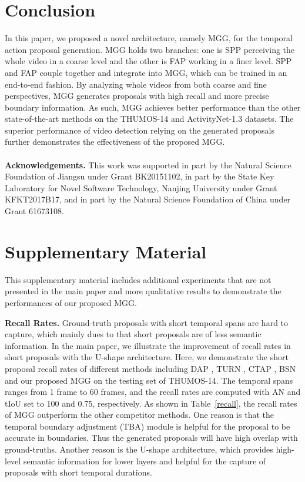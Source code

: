 \documentclass[10pt,twocolumn,letterpaper]{article}
\begin{document}
\section{Conclusion}
In this paper, we proposed a novel architecture, namely MGG, for the temporal action proposal generation. MGG holds two branches: one is SPP perceiving the whole video in a coarse level and the other is FAP working in a finer level. SPP and FAP couple together and integrate into MGG, which can be trained in an end-to-end fashion. By analyzing whole videos from both coarse and fine perspectives,  MGG generates proposals with high recall and more precise boundary information. As such, MGG achieves better performance than the other state-of-the-art methods on the THUMOS-14 and ActivityNet-1.3 datasets. The superior performance of video detection relying on the generated proposals  further demonstrates the effectiveness of the proposed MGG.
\\
\\
\small{\textbf{Acknowledgements.} This work was supported in part by the Natural Science Foundation of Jiangsu under Grant BK20151102, in part by the State Key Laboratory for Novel Software Technology, Nanjing University under Grant KFKT2017B17, and in part by the Natural Science Foundation of China under Grant 61673108.}
{\small


}


\clearpage
\appendix
\section{Supplementary Material}

This  supplementary material includes additional experiments that are not presented in the main paper and more qualitative results to demonstrate the performances of our proposed MGG.


\textbf{Recall Rates.}
Ground-truth proposals with short temporal spans are hard to capture, which mainly dues to that short proposals are of less semantic information. In the main paper, we illustrate the improvement of recall rates in short proposals with the U-shape architecture. Here, we demonstrate the short proposal recall rates of different methods including DAP \cite{dap}, TURN \cite{turn_tap}, CTAP \cite{ctap}, BSN \cite{bsn} and our proposed MGG on  the testing set of THUMOS-14. The temporal spans ranges from 1 frame to 60 frames, and the recall rates are computed with AN and tIoU set to 100 and 0.75, respectively. As shown in Table~\ref{recall}, the recall rates of MGG outperform the other competitor methods. One reason is that the temporal boundary adjustment (TBA) module is helpful for the proposal to be accurate in boundaries. Thus the generated proposals will have high overlap with ground-truths. Another reason is the U-shape architecture, which provides high-level semantic information for lower layers and helpful for the capture of proposals with short temporal durations.
\end{document}
